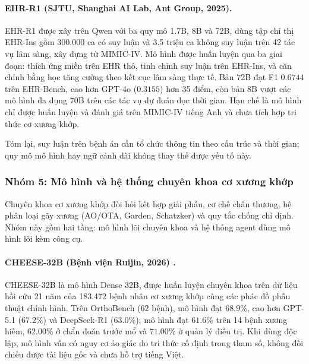 \paragraph{EHR-R1 (SJTU, Shanghai AI Lab, Ant Group, 2025).}
EHR-R1 được xây trên Qwen với ba quy mô 1.7B, 8B và 72B, dùng tập chỉ thị EHR-Ins gồm 300.000 ca có suy luận và 3.5 triệu ca không suy luận trên 42 tác vụ lâm sàng, xây dựng từ MIMIC-IV. Mô hình được huấn luyện qua ba giai đoạn: thích ứng miền trên EHR thô, tinh chỉnh suy luận trên EHR-Ins, và căn chỉnh bằng học tăng cường theo kết cục lâm sàng thực tế. Bản 72B đạt F1 $0.6744$ trên EHR-Bench, cao hơn GPT-4o ($0.3155$) hơn 35 điểm, còn bản 8B vượt các mô hình đa dụng 70B trên các tác vụ dự đoán dọc thời gian. Hạn chế là mô hình chỉ được huấn luyện và đánh giá trên MIMIC-IV tiếng Anh và chưa tích hợp tri thức cơ xương khớp.

Tóm lại, suy luận trên bệnh án cần tổ chức thông tin theo cấu trúc và thời gian; quy mô mô hình hay ngữ cảnh dài không thay thế được yếu tố này.

\subsubsection{Nhóm 5: Mô hình và hệ thống chuyên khoa cơ xương khớp}
Chuyên khoa cơ xương khớp đòi hỏi kết hợp giải phẫu, cơ chế chấn thương, hệ phân loại gãy xương (AO/OTA, Garden, Schatzker) và quy tắc chống chỉ định. Nhóm này gồm hai tầng: mô hình lõi chuyên khoa và hệ thống agent dùng mô hình lõi kèm công cụ.

\paragraph{CHEESE-32B (Bệnh viện Ruijin, 2026) \cite{orthopilot_2026}.}
CHEESE-32B là mô hình Dense 32B, được huấn luyện chuyên khoa trên dữ liệu hồi cứu 21 năm của 183.472 bệnh nhân cơ xương khớp cùng các phác đồ phẫu thuật chỉnh hình. Trên OrthoBench (62 bệnh), mô hình đạt $68.9\%$, cao hơn GPT-5.1 ($67.2\%$) và DeepSeek-R1 ($63.0\%$); mô hình đạt $61.6\%$ trên 14 bệnh xương hiếm, $62.00\%$ ở chẩn đoán trước mổ và $71.00\%$ ở quản lý điều trị. Khi dùng độc lập, mô hình vẫn có nguy cơ ảo giác do tri thức cố định trong tham số, không đối chiếu được tài liệu gốc và chưa hỗ trợ tiếng Việt.


